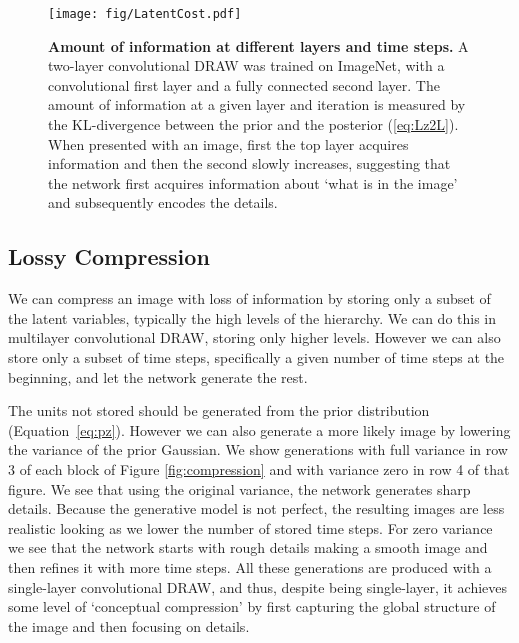 \documentclass{article}
\begin{document}
\begin{figure}[t]
\vspace{-.0cm}
\begin{center}
\begin{minipage}{0.5\textwidth}
\texttt{[image: fig/LatentCost.pdf]}
\caption{\textbf{Amount of information at different layers and time steps.} A two-layer convolutional DRAW was trained on ImageNet, with a convolutional first layer and a fully connected second layer. The amount of information at a given layer and iteration is measured by the KL-divergence between the prior and the posterior (\ref{eq:Lz2L}). When presented with an image, first the top layer acquires information and then the second slowly increases, suggesting that the network first acquires information about `what is in the image' and subsequently encodes the details.
}
\vspace{-0.6cm}
\label{fig:LatentCost}
\end{minipage}
\end{center}
\vspace{-.0cm}
\end{figure}

\subsection{Lossy Compression}

We can compress an image with loss of information by storing only a subset of the latent variables, typically the high levels of the hierarchy. We can do this in multilayer convolutional DRAW, storing only higher levels. However we can also store only a subset of time steps, specifically a given number of time steps at the beginning, and let the network generate the rest.

The units not stored should be generated from the prior distribution (Equation~\ref{eq:pz}). However we can also generate a more likely image by lowering the variance of the prior Gaussian. We show generations with full variance in row 3 of each block of Figure \ref{fig:compression} and with variance zero in row 4 of that figure. We see that using the original variance, the network generates sharp details. Because the generative model is not perfect, the resulting images are less realistic looking as we lower the number of stored time steps. For zero variance we see that the network starts with rough details making a smooth image and then refines it with more time steps. All these generations are produced with a single-layer convolutional DRAW, and thus, despite being single-layer, it achieves some level of `conceptual compression' by first capturing the global structure of the image and then focusing on details.
\end{document}
